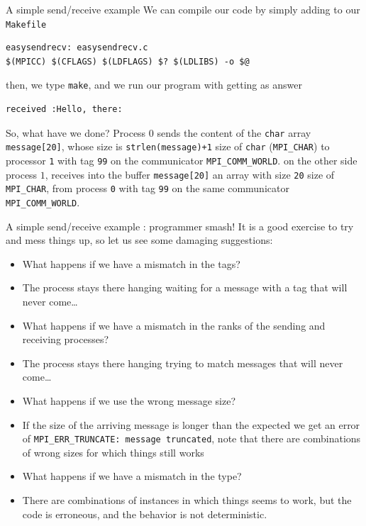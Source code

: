 \documentclass[xcolor={svgnames,usenames}]{beamer}
\begin{document}
\begin{frame}[fragile]{A simple send/receive example}
\small
We can compile our code by simply adding to our \texttt{Makefile} 
\begin{verbatim}
easysendrecv: easysendrecv.c
$(MPICC) $(CFLAGS) $(LDFLAGS) $? $(LDLIBS) -o $@
\end{verbatim}
then, we type \texttt{make}, and we run our program with  getting as answer
\begin{verbatim}
received :Hello, there:
\end{verbatim}
So, what have we done?
{\scriptsize {}}
Process $0$ sends the content of the \texttt{char} array \texttt{message[20]}, whose size is \texttt{strlen(message)+1} size of \texttt{char} (\texttt{MPI_CHAR}) to processor \texttt{1} with tag \texttt{99} on the communicator \texttt{MPI_COMM_WORLD}.
{\scriptsize {}}
on the other side process $1$, receives into the buffer \texttt{message[20]} an array with size \texttt{20} size of \texttt{MPI_CHAR}, from process \texttt{0} with tag \texttt{99} on the same communicator \texttt{MPI_COMM_WORLD}.
\end{frame}

\begin{frame}{A simple send/receive example : programmer smash!}
It is a good exercise to try and mess things up, so let us see some damaging suggestions:
\begin{itemize}
\item<1-> What happens if we have a mismatch in the tags?
\item[A:]<2-> The process stays there hanging waiting for a message with a tag that will never come\ldots 
\item<1-> What happens if we have a mismatch in the ranks of the sending and receiving processes?
\item[A:]<3-> The process stays there hanging trying to match messages that will never come\ldots 
\item<1-> What happens if we use the wrong message size?
\item[A:]<4-> If the size of the arriving message is longer than the expected we get an error of \texttt{MPI_ERR_TRUNCATE: message truncated}, note that there are combinations of wrong sizes for which things still works
\item<1-> What happens if we have a mismatch in the type?
\item[A:]<5-> There are combinations of instances in which things seems to work, \alert{but} the code is erroneous, and the behavior is not deterministic.
\end{itemize}
\end{frame}
\end{document}
